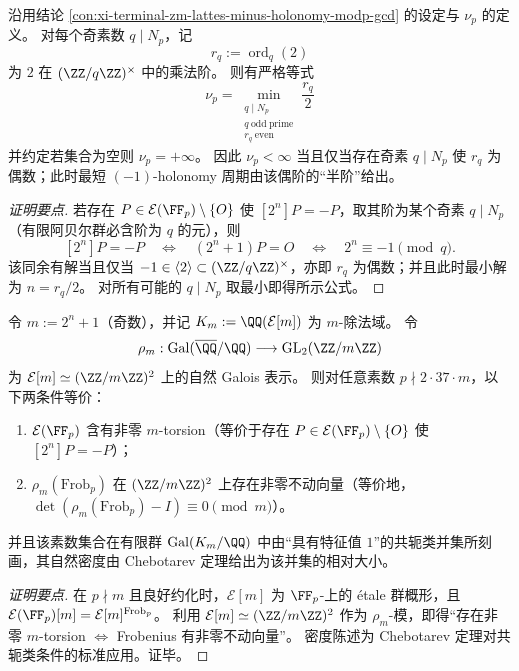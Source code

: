 \begin{conclusion}\label{con:xi-terminal-zm-lattes-minus-holonomy-shortest-period-halforder}
沿用结论 \ref{con:xi-terminal-zm-lattes-minus-holonomy-modp-gcd} 的设定与 \(\nu_p\) 的定义。
对每个奇素数 \(q\mid N_p\)，记
\[
r_q:=\operatorname{ord}_q(2)
\]
为 \(2\) 在 \((\ZZ/q\ZZ)^{\times}\) 中的乘法阶。
则有严格等式
\[
\boxed{\;
\nu_p=\min_{\substack{q\mid N_p\\ q\ \mathrm{odd\ prime}\\ r_q\ \mathrm{even}}}\frac{r_q}{2}\;}
\]
并约定若集合为空则 \(\nu_p=+\infty\)。
因此 \(\nu_p<\infty\) 当且仅当存在奇素 \(q\mid N_p\) 使 \(r_q\) 为偶数；此时最短 \((-1)\)-holonomy 周期由该偶阶的“半阶”给出。
\end{conclusion}
\begin{proof}[证明要点]
若存在 \(P\in\mathcal{E}(\FF_p)\setminus\{O\}\) 使 \([2^n]P=-P\)，取其阶为某个奇素 \(q\mid N_p\)（有限阿贝尔群必含阶为 \(q\) 的元），则
\[
[2^n]P=-P\quad\Longleftrightarrow\quad (2^n+1)P=O\quad\Longleftrightarrow\quad 2^n\equiv -1\pmod q.
\]
该同余有解当且仅当 \(-1\in\langle 2\rangle\subset(\ZZ/q\ZZ)^\times\)，亦即 \(r_q\) 为偶数；并且此时最小解为 \(n=r_q/2\)。
对所有可能的 \(q\mid N_p\) 取最小即得所示公式。
\end{proof}

\begin{conclusion}[除法域的 Chebotarev 刻画：\texorpdfstring{$m=2^{n}+1$}{m=2^n+1} 时 \texorpdfstring{$(-1)$}{-1}-holonomy 与 Frobenius 不动向量]\label{con:xi-terminal-zm-lattes-minus-holonomy-division-field-chebotarev}
令 \(m:=2^{n}+1\)（奇数），并记 \(K_m:=\QQ(\mathcal{E}[m])\) 为 \(m\)-除法域。
令
\[
\rho_m:\mathrm{Gal}(\overline{\QQ}/\QQ)\longrightarrow \mathrm{GL}_2(\ZZ/m\ZZ)
\]
为 \(\mathcal{E}[m]\simeq(\ZZ/m\ZZ)^2\) 上的自然 Galois 表示。
则对任意素数 \(p\nmid 2\cdot 37\cdot m\)，以下两条件等价：
\begin{enumerate}
  \item \(\mathcal{E}(\FF_p)\) 含有非零 \(m\)-torsion（等价于存在 \(P\in\mathcal{E}(\FF_p)\setminus\{O\}\) 使 \([2^{n}]P=-P\)）；
  \item \(\rho_m(\mathrm{Frob}_p)\) 在 \((\ZZ/m\ZZ)^2\) 上存在非零不动向量（等价地，\(\det(\rho_m(\mathrm{Frob}_p)-I)\equiv 0\pmod m\)）。
\end{enumerate}
并且该素数集合在有限群 \(\mathrm{Gal}(K_m/\QQ)\) 中由“具有特征值 \(1\)”的共轭类并集所刻画，其自然密度由 Chebotarev 定理给出为该并集的相对大小。
\end{conclusion}
\begin{proof}[证明要点]
在 \(p\nmid m\) 且良好约化时，\(\mathcal{E}[m]\) 为 \(\FF_p\)-上的 \'{e}tale 群概形，且
\(\mathcal{E}(\FF_p)[m]=\mathcal{E}[m]^{\mathrm{Frob}_p}\)。
利用 \(\mathcal{E}[m]\simeq(\ZZ/m\ZZ)^2\) 作为 \(\rho_m\)-模，即得“存在非零 \(m\)-torsion \(\Leftrightarrow\) Frobenius 有非零不动向量”。
密度陈述为 Chebotarev 定理对共轭类条件的标准应用。证毕。
\end{proof}


